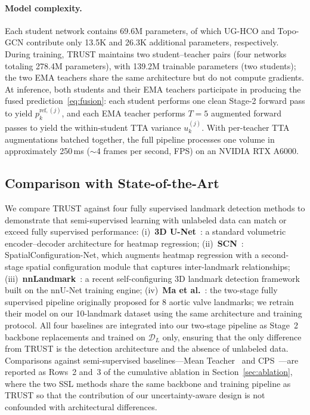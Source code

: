 \documentclass[conference]{IEEEtran}
\begin{document}
\paragraph{Model complexity.}
Each student network contains 69.6M parameters, of which UG-HCO and Topo-GCN contribute only 13.5K and 26.3K additional parameters, respectively. During training, TRUST maintains two student--teacher pairs (four networks totaling 278.4M parameters), with 139.2M trainable parameters (two students); the two EMA teachers share the same architecture but do not compute gradients. At inference, both students and their EMA teachers participate in producing the fused prediction~\eqref{eq:fusion}: each student performs one clean Stage-2 forward pass to yield $p_k^{\mathrm{ref},(j)}$, and each EMA teacher performs $T=5$ augmented forward passes to yield the within-student TTA variance $u_k^{(j)}$. With per-teacher TTA augmentations batched together, the full pipeline processes one volume in approximately 250\,ms ($\sim$4 frames per second, FPS) on an NVIDIA RTX A6000.

\subsection{Comparison with State-of-the-Art}
\label{sec:comparison}

We compare TRUST against four fully supervised landmark detection methods to demonstrate that semi-supervised learning with unlabeled data can match or exceed fully supervised performance:
(i)~\textbf{3D U-Net}~\cite{Cicek2016_3dunet}: a standard volumetric encoder--decoder architecture for heatmap regression;
(ii)~\textbf{SCN}~\cite{Payer2019_integrating_spatial}: SpatialConfiguration-Net, which augments heatmap regression with a second-stage spatial configuration module that captures inter-landmark relationships;
(iii)~\textbf{nnLandmark}~\cite{nnLandmark2025}: a recent self-configuring 3D landmark detection framework built on the nnU-Net training engine;
(iv)~\textbf{Ma et al.}~\cite{Ma2023_aortic_landmarks}: the two-stage fully supervised pipeline originally proposed for 8 aortic valve landmarks; we retrain their model on our 10-landmark dataset using the same architecture and training protocol.
All four baselines are integrated into our two-stage pipeline as Stage~2 backbone replacements and trained on $\mathcal{D}_L$ only, ensuring that the only difference from TRUST is the detection architecture and the absence of unlabeled data. Comparisons against semi-supervised baselines---Mean Teacher~\cite{Tarvainen2017_mean_teacher} and CPS~\cite{Chen2021_cps,Ren2024_g2lcps}---are reported as Rows~2 and~3 of the cumulative ablation in Section~\ref{sec:ablation}, where the two SSL methods share the same backbone and training pipeline as TRUST so that the contribution of our uncertainty-aware design is not confounded with architectural differences.
\end{document}
